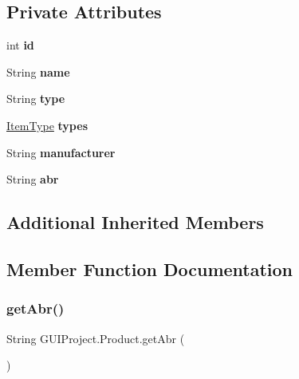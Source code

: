 \subsection*{Private Attributes}
\begin{DoxyCompactItemize}
\item 
\mbox{\label{class_g_u_i_project_1_1_product_a2dc3e617a86fe3af959fd8ca0222eb95}} 
int {\bfseries id}
\item 
\mbox{\label{class_g_u_i_project_1_1_product_ae208d5b1813b8bb95e1ce1f6fe5f2763}} 
String {\bfseries name}
\item 
\mbox{\label{class_g_u_i_project_1_1_product_a1c24ec3faae995f0c58381bd2bb224d8}} 
String {\bfseries type}
\item 
\mbox{\label{class_g_u_i_project_1_1_product_af4fe59c3b123d9d72dca325a32528175}} 
\mbox{\hyperlink{enum_g_u_i_project_1_1_item_type}{Item\+Type}} {\bfseries types}
\item 
\mbox{\label{class_g_u_i_project_1_1_product_aeb459f2d5ce4f55acbd64139a3da309f}} 
String {\bfseries manufacturer}
\item 
\mbox{\label{class_g_u_i_project_1_1_product_a757685c1384d09cfaa7a4a9ea170c3f2}} 
String {\bfseries abr}
\end{DoxyCompactItemize}
\subsection*{Additional Inherited Members}


\subsection{Member Function Documentation}
\mbox{\label{class_g_u_i_project_1_1_product_a09a96298af0d886657d9badd38dd8dca}} 
\subsubsection{\texorpdfstring{getAbr()}{getAbr()}}
{\footnotesize\ttfamily String G\+U\+I\+Project.\+Product.\+get\+Abr (\begin{DoxyParamCaption}{ }\end{DoxyParamCaption})}

